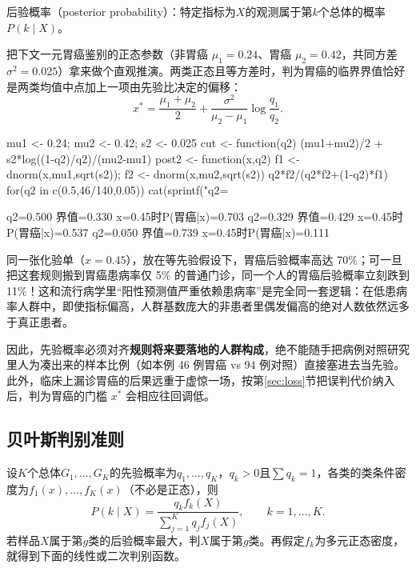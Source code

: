 后验概率（posterior probability）：特定指标为$X$的观测属于第$k$个总体的概率$P(k\mid X)$。
\begin{sikao}[先验概率为何能彻底改变诊断结论？]
把下文一元胃癌鉴别的正态参数（非胃癌 $\mu_1=0.24$、胃癌 $\mu_2=0.42$，共同方差 $\sigma^2=0.025$）拿来做个直观推演。两类正态且等方差时，判为胃癌的临界界值恰好是两类均值中点加上一项由先验比决定的偏移：
\[
x^*=\frac{\mu_1+\mu_2}2+\frac{\sigma^2}{\mu_2-\mu_1}\log\frac{q_1}{q_2}.
\]
\par\noindent\begin{rcode}
mu1 <- 0.24; mu2 <- 0.42; s2 <- 0.025
cut   <- function(q2) (mu1+mu2)/2 + s2*log((1-q2)/q2)/(mu2-mu1)
post2 <- function(x,q2){ f1 <- dnorm(x,mu1,sqrt(s2)); f2 <- dnorm(x,mu2,sqrt(s2))
                         q2*f2/(q2*f2+(1-q2)*f1) }
for(q2 in c(0.5,46/140,0.05))
  cat(sprintf("q2=%
\end{rcode}
\begin{routput}
q2=0.500  界值=0.330  x=0.45时P(胃癌|x)=0.703
q2=0.329  界值=0.429  x=0.45时P(胃癌|x)=0.537
q2=0.050  界值=0.739  x=0.45时P(胃癌|x)=0.111
\end{routput}
同一张化验单（$x=0.45$），放在等先验假设下，胃癌后验概率高达 70\%；可一旦把这套规则搬到胃癌患病率仅 5\% 的普通门诊，同一个人的胃癌后验概率立刻跌到 11\%！这和流行病学里“阳性预测值严重依赖患病率”是完全同一套逻辑：在低患病率人群中，即使指标偏高，人群基数庞大的非患者里偶发偏高的绝对人数依然远多于真正患者。

因此，先验概率必须对齐\textbf{规则将来要落地的人群构成}，绝不能随手把病例对照研究里人为凑出来的样本比例（如本例 46 例胃癌 vs 94 例对照）直接塞进去当先验。此外，临床上漏诊胃癌的后果远重于虚惊一场，按第\ref{sec:loss}节把误判代价纳入后，判为胃癌的门槛 $x^*$ 会相应往回调低。
\end{sikao}
\subsection{贝叶斯判别准则}
设$K$个总体$G_1,\ldots,G_K$的先验概率为$q_1,\ldots,q_K$，$q_k>0$且$\sum q_k=1$，各类的类条件密度为$f_1(x),\ldots,f_K(x)$（不必是正态），则
\begin{equation}
P(k\mid X)=\frac{q_kf_k(X)}{\sum_{j=1}^Kq_jf_j(X)},\qquad k=1,\ldots,K.
\end{equation}
若样品$X$属于第$g$类的后验概率最大，判$X$属于第$g$类。再假定$f_k$为多元正态密度，就得到下面的线性或二次判别函数。
